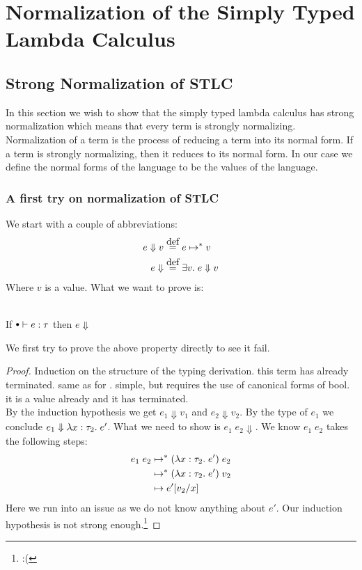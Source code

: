 \section*{Normalization of the Simply Typed Lambda Calculus}
\subsection*{Strong Normalization of STLC}
In this section we wish to show that the simply typed lambda calculus has strong normalization which means that every term is strongly normalizing. Normalization of a term is the process of reducing a term into its normal form. If a term is strongly normalizing, then it reduces to its normal form. In our case we define the normal forms of the language to be the values of the language.
\subsubsection*{A first try on normalization of STLC}
We start with a couple of abbreviations:
\begin{align*}
  e \Downarrow v & \eqdef e \evaltos v \\
  e \Downarrow   & \eqdef \exists v. \; e \Downarrow v
\end{align*}
Where $v$ is a value.
What we want to prove is:
\begin{strnorm}~\\
  If $\mtenv \vdash e : \tau$ then $e \Downarrow$
\end{strnorm}
We first try to prove the above property directly to see it fail.
\begin{proof} 
Induction on the structure of the typing derivation.
 this term has already terminated.
 same as for \true.
 simple, but requires the use of canonical forms of bool.
 it is a value already and it has terminated.
\case{$ \TApp $} \\
By the induction hypothesis we get $e_1 \Downarrow v_1$ and $e_2 \Downarrow v_2$. By the type of $e_1$ we conclude $e_1 \Downarrow \lambda x : \tau_2 . \; e'$. What we need to show is $e_1 \; e_2 \Downarrow$. We know $e_1 \; e_2$ takes the following steps:
\begin{align*}
  e_1 \; e_2 & \mapsto^{*} (\lambda x : \tau_2 . \; e') \; e_2 \\
            & \mapsto^{*} (\lambda x : \tau_2 . \; e') \; v_2 \\
            & \mapsto e'[v_2/x]
\end{align*}
Here we run into an issue as we do not know anything about $e'$. Our induction hypothesis is not strong enough.\footnote{:(}
\end{proof}

